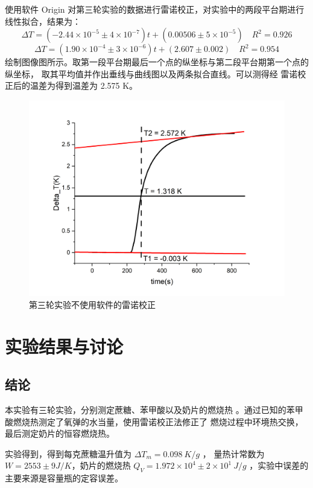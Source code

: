 \documentclass[cn,hazy,pku,12pt,normal,math=newtx,cite=super]{elegantnote}
\begin{document}
使用软件 Origin 对第三轮实验的数据进行雷诺校正，对实验中的两段平台期进行线性拟合，结果为：
$$
\Delta T = (-2.44\times10^{-5} \pm 4\times10^{-7}) t + (0.00506 \pm 5\times10^{-5}) \quad R^2 = 0.926
$$
$$
\Delta T = (1.90\times10^{-4} \pm 3\times10^{-6}) t + (2.607 \pm 0.002) \quad R^2 = 0.954
$$
绘制图像图所示。取第一段平台期最后一个点的纵坐标与第二段平台期第一个点的纵坐标，
取其平均值并作出垂线与曲线图以及两条拟合直线。可以测得经
雷诺校正后的温差为得到温差为 2.575 K。
\begin{figure}[htbp]
    \centering
    \includegraphics[width = .70\textwidth]{image/Graph1.png}
    \caption{第三轮实验不使用软件的雷诺校正}\label{8}
\end{figure}


\section{实验结果与讨论}

\subsection{结论}

本实验有三轮实验，分别测定蔗糖、苯甲酸以及奶片的燃烧热
。通过已知的苯甲酸燃烧热测定了氧弹的水当量，使用雷诺校正法修正了
燃烧过程中环境热交换，最后测定奶片的恒容燃烧热。

实验得到，得到每克蔗糖温升值为 $\Delta T_m = 0.098\ K/g$ ，
量热计常数为 $ W = 2553 \pm 9 J/K$，奶片的燃烧热 $Q_V = 1.972 \times 10^4 \pm 2 \times 10^1\ J/g$
，实验中误差的主要来源是容量瓶的定容误差。

\nocite{*}

\end{document}
